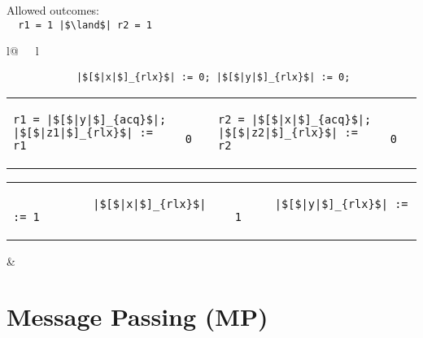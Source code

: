 \begin{minipage}[t]{0.2\linewidth}
Allowed outcomes:\\
\lstinline{  r1 = 1 |$\land$| r2 = 1}\\
\end{minipage}
%
\begin{minipage}[t]{0.4\linewidth}
\vspace{-.2cm}
  \begin{tabular}{l@{\ \ \ }l}
    \begin{minipage}[l]{4.3cm} \small
\begin{lstlisting}
            |$[$|x|$]_{rlx}$| := 0; |$[$|y|$]_{rlx}$| := 0;
\end{lstlisting}
\vspace{-.2cm}
\begin{tabular}{l||l||l||l}
\begin{lstlisting}
r1 = |$[$|y|$]_{acq}$|;
|$[$|z1|$]_{rlx}$| := r1
\end{lstlisting}
\hspace{.6cm}
&
\begin{lstlisting}
  0
\end{lstlisting}
\hspace{.6cm}
&
\begin{lstlisting}
r2 = |$[$|x|$]_{acq}$|;
|$[$|z2|$]_{rlx}$| := r2
\end{lstlisting}
\hspace{.6cm}
&
\begin{lstlisting}
  0
\end{lstlisting}
\end{tabular}

\vspace{-1pt}
\begin{tabular}{l||l}
  \begin{lstlisting}
            |$[$|x|$]_{rlx}$| := 1
  \end{lstlisting}
\hspace{2.52em}
&
  \begin{lstlisting}
      |$[$|y|$]_{rlx}$| := 1
  \end{lstlisting}
\end{tabular}
    \end{minipage}
&
  \end{tabular}
\end{minipage}
\litmusTestEnd

\section{Message Passing (MP)}
\label{app:mp}


